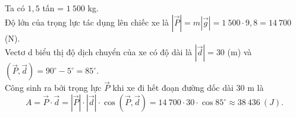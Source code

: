 \begin{vd}
{\begin{center}
		\end{center}
		\noindent
		Ta có $1{,}5$ tấn = $1~500$ kg.\\
		Độ lớn của trọng lực tác dụng lên chiếc xe là $\left|\vec{P}\right| = m \left|\vec{g}\right| = 1~500\cdot 9{,}8 = 14~700$ (N).\\
		Vectơ d biểu thị độ dịch chuyển của xe có độ dài là $\left|\vec{d}\right| = 30$ (m) và $ \left(\vec{P},\vec{d}\right)= 90^\circ - 5^\circ = 85^\circ$.\\
		Công sinh ra bởi trọng lực $\vec{P}$ khi xe đi hết đoạn đường dốc dài $30$ m là
		$$A=\vec{P}\cdot\vec{d}=\left|\vec{P}\right|\cdot\left|\vec{d}\right|\cdot\cos\left(\vec{P},\vec{d}\right) = 14~700\cdot 30\cdot \cos 85^\circ \approx 38~436~(J).$$
	}
\end{vd}

